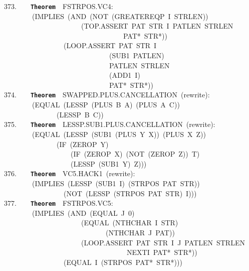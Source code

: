 \documentclass[11pt]{book}
\newenvironment{pubasis}{\begin{flushleft}\ttfamily\small}{\normalsize\rmfamily\end{flushleft}}
\newcommand{\axiomordefinition}[1]{\vspace{6pt}\texttt{\textbf{#1}}}
\begin{document}
\begin{pubasis}
373.~~~~\axiomordefinition{Theorem}~~FSTRPOS.VC4:\\
~~~~~~~~(IMPLIES~(AND~(NOT~(GREATEREQP~I~STRLEN))\\
~~~~~~~~~~~~~~~~~~~~~~(TOP.ASSERT~PAT~STR~I~PATLEN~STRLEN\\
~~~~~~~~~~~~~~~~~~~~~~~~~~~~~~~~~~PAT*~STR*))\\
~~~~~~~~~~~~~~~~~(LOOP.ASSERT~PAT~STR~I\\
~~~~~~~~~~~~~~~~~~~~~~~~~~~~~~(SUB1~PATLEN)\\
~~~~~~~~~~~~~~~~~~~~~~~~~~~~~~PATLEN~STRLEN\\
~~~~~~~~~~~~~~~~~~~~~~~~~~~~~~(ADD1~I)\\
~~~~~~~~~~~~~~~~~~~~~~~~~~~~~~PAT*~STR*))\\

374.~~~~\axiomordefinition{Theorem}~~SWAPPED.PLUS.CAN\-CELLATION~(rewrite):\\
~~~~~~~~(EQUAL~(LESSP~(PLUS~B~A)~(PLUS~A~C))\\
~~~~~~~~~~~~~~~(LESSP~B~C))\\

375.~~~~\axiomordefinition{Theorem}~~LESSP.SUB1.PLUS.CAN\-CELLATION~(rewrite):\\
~~~~~~~~(EQUAL~(LESSP~(SUB1~(PLUS~Y~X))~(PLUS~X~Z))\\
~~~~~~~~~~~~~~~(IF~(ZEROP~Y)\\
~~~~~~~~~~~~~~~~~~~(IF~(ZEROP~X)~(NOT~(ZEROP~Z))~T)\\
~~~~~~~~~~~~~~~~~~~(LESSP~(SUB1~Y)~Z)))\\

376.~~~~\axiomordefinition{Theorem}~~VC5.HACK1~(rewrite):\\
~~~~~~~~(IMPLIES~(LESSP~(SUB1~I)~(STRPOS~PAT~STR))\\
~~~~~~~~~~~~~~~~~(NOT~(LESSP~(STRPOS~PAT~STR)~I)))\\

377.~~~~\axiomordefinition{Theorem}~~FSTRPOS.VC5:\\
~~~~~~~~(IMPLIES~(AND~(EQUAL~J~0)\\
~~~~~~~~~~~~~~~~~~~~~~(EQUAL~(NTHCHAR~I~STR)\\
~~~~~~~~~~~~~~~~~~~~~~~~~~~~~(NTHCHAR~J~PAT))\\
~~~~~~~~~~~~~~~~~~~~~~(LOOP.ASSERT~PAT~STR~I~J~PATLEN~STRLEN\\
~~~~~~~~~~~~~~~~~~~~~~~~~~~~~~~~~~~NEXTI~PAT*~STR*))\\
~~~~~~~~~~~~~~~~~(EQUAL~I~(STRPOS~PAT*~STR*)))\\


\end{pubasis}
\end{document}
